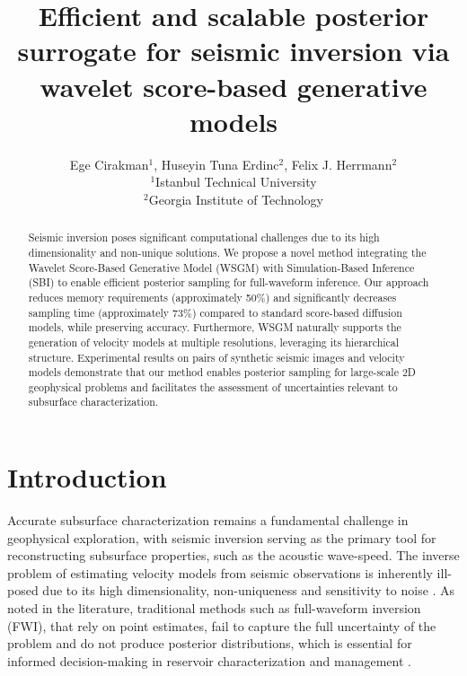 \documentclass{IMAGE2025}
\begin{document}
\title{Efficient and scalable posterior surrogate for seismic inversion via wavelet score-based generative models}

\renewcommand{\thefootnote}{\fnsymbol{footnote}} 

\author{Ege Cirakman$^1$, Huseyin Tuna Erdinc$^2$, Felix J. Herrmann$^2$\\
$^1$Istanbul Technical University\\
$^2$Georgia Institute of Technology}

\maketitle

\begin{abstract}
Seismic inversion poses significant computational challenges due to its high dimensionality and non-unique solutions. We propose a novel method integrating the Wavelet Score-Based Generative Model (WSGM) with Simulation-Based Inference (SBI) to enable efficient posterior sampling for full-waveform inference. Our approach reduces memory requirements (approximately 50\%) and significantly decreases sampling time (approximately 73\%) compared to standard score-based diffusion models, while preserving accuracy. Furthermore, WSGM naturally supports the generation of velocity models at multiple resolutions, leveraging its hierarchical structure. Experimental results on pairs of synthetic seismic images and velocity models demonstrate that our method enables posterior sampling for large-scale 2D geophysical problems and facilitates the assessment of uncertainties relevant to subsurface characterization.
\end{abstract}


\section{Introduction}

Accurate subsurface characterization remains a fundamental challenge in geophysical exploration, with seismic inversion serving as the primary tool for reconstructing subsurface properties, such as the acoustic wave-speed. The inverse problem of estimating velocity models from seismic observations is inherently ill-posed due to its high dimensionality, non-uniqueness and sensitivity to noise \cite{virieux2009overview, Tarantola2005InverseProblemTheory}. As noted in the literature, traditional methods such as full-waveform inversion (FWI), that rely on point estimates, fail to capture the full uncertainty of the problem and do not produce posterior distributions, which is essential for informed decision-making in reservoir characterization and management \cite{siahkoohi2022deep, fichtner2013multiscale, XIAO2025112160}.




\end{document}
